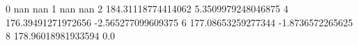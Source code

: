 0 nan nan
1 nan nan
2 184.31118774414062 5.3509979248046875
4 176.39491271972656 -2.565277099609375
6 177.08653259277344 -1.8736572265625
8 178.96018981933594 0.0
